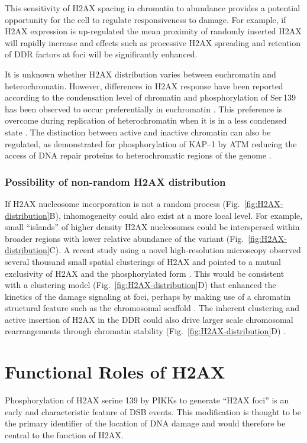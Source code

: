 \documentclass[graybox]{svmult}
\begin{document}
This sensitivity of H2AX spacing in chromatin to abundance provides a potential opportunity for the
cell to regulate responsiveness to damage. For example, if H2AX expression is up-regulated the mean
proximity of randomly inserted H2AX will rapidly increase and effects such as processive \ugamma H2AX
spreading and retention of DDR factors at foci will be significantly enhanced.

It is unknown whether H2AX distribution varies between euchromatin and heterochromatin. However,
differences in H2AX response have been reported according to the condensation level of chromatin and
phosphorylation of Ser\,139 has been observed to occur preferentially in euchromatin \cite{IGC+07}.
This preference is overcome during replication of heterochromatin when it is in a less condensed
state \cite{IGC+07}. The distinction between active and inactive chromatin can also be regulated, as
demonstrated for phosphorylation of KAP--1 by ATM reducing the access of DNA repair proteins to
heterochromatic regions of the genome \cite{AAG+08}.

\subsubsection{Possibility of non-random H2AX distribution}
\label{subsubsec:Nonrandom-distribution}
If H2AX nucleosome incorporation is not a random process (Fig.~\ref{fig:H2AX-distribution}B),
inhomogeneity could also exist at a more local level. For example, small ``islands'' of higher
density H2AX nucleosomes could be interspersed within broader regions with lower relative abundance
of the variant (Fig.~\ref{fig:H2AX-distribution}C). A recent study using a novel high-resolution
microscopy observed several thousand small spatial clusterings of H2AX and pointed to a mutual
exclusivity of H2AX and the phosphorylated form \cite{JBBTB06}. This would be consistent with a
clustering model (Fig.~\ref{fig:H2AX-distribution}D) that enhanced the kinetics of the damage
signaling at foci, perhaps by making use of a chromatin structural feature such as the chromosomal
scaffold \cite{JBBTB06}. The inherent clustering and active insertion of H2AX in the DDR could also
drive larger scale chromosomal rearrangements through chromatin stability (Fig.~\ref{fig:H2AX-distribution}D) \cite{KHHK+08}.

\section{Functional Roles of H2AX}
\label{sec:function}
Phosphorylation of H2AX serine 139 by PIKKs to generate ``\ugamma H2AX foci'' is an early and
characteristic feature of DSB events. This modification is thought to be the primary identifier of
the location of DNA damage and would therefore be central to the function of H2AX.
\end{document}
